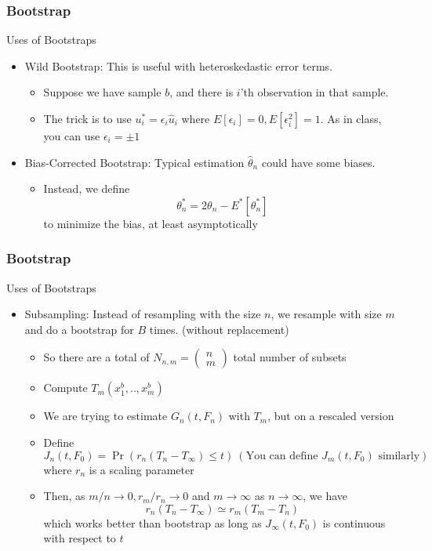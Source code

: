 \documentclass{beamer}
\begin{document}
\begin{frame}
\frametitle{Bootstrap}
Uses of Bootstraps
\begin{itemize}
\item Wild Bootstrap: This is useful with heteroskedastic error terms. 
\begin{itemize} 
\item Suppose we have sample $b$, and there is  $i$'th observation in that sample. 
\item The trick is to use $u_i^*= \epsilon_i\hat{u}_i$ where $E[\epsilon_i]=0, E[\epsilon_i^2]=1$. As in class, you can use $\epsilon_i = \pm 1$
\end{itemize}
\item Bias-Corrected Bootstrap: Typical estimation $\hat{\theta}_n$ could have some biases.
\begin{itemize}
\item Instead, we define
\[
\theta_n^*=2\theta_n-E^*[\theta_n^*]
\]
to minimize the bias, at least asymptotically
\end{itemize}
\end{itemize}
\end{frame}

\begin{frame}
\frametitle{Bootstrap}
Uses of Bootstraps
\begin{itemize}
\item Subsampling: Instead of resampling with the size $n$, we resample with size $m$ and do a bootstrap for $B$ times. (without replacement)
\begin{itemize}
\item So there are a total of $N_{n,m}=\begin{pmatrix} n \\ m \end{pmatrix}$ total number of subsets
\item Compute $T_m(x_1^b,..,x_m^b)$
\item  We are trying to estimate $G_n(t, F_n)$ with $T_m$, but on a rescaled version
\item Define
\[
J_n(t,F_0)=\Pr(r_n(T_n-T_\infty)\leq t) \ (\text{You can define $J_m(t,F_0)$ similarly})
\]
where $r_n$ is a scaling parameter 
\item Then, as $m/n\to0, r_m/r_n\to0$ and $m\to\infty$ as $n\to\infty$, we have 
\[
r_n(T_n-T_\infty) \simeq r_m(T_m-T_n)
\]
which works better than bootstrap as long as $J_\infty (t,F_0)$ is continuous with respect to $t$
\end{itemize}
\end{itemize}
\end{frame}
\end{document}
